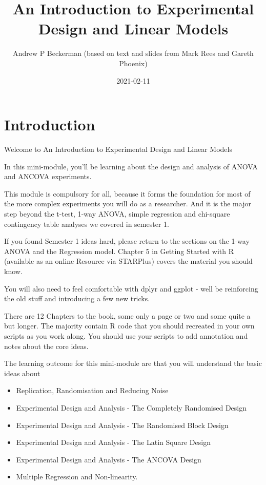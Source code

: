 \documentclass[
]{book}
\title{An Introduction to Experimental Design and Linear Models}
\author{Andrew P Beckerman (based on text and slides from Mark Rees and Gareth Phoenix)}
\date{2021-02-11}
\providecommand{\tightlist}{%
  \setlength{\itemsep}{0pt}\setlength{\parskip}{0pt}}
\begin{document}
\maketitle

{
\setcounter{tocdepth}{1}
\tableofcontents
}
\hypertarget{introduction}{%
\chapter{Introduction}\label{introduction}}

Welcome to An Introduction to Experimental Design and Linear Models

In this mini-module, you'll be learning about the design and analysis of ANOVA and ANCOVA experiments.

This module is compulsory for all, because it forms the foundation for most of the more complex experiments you will do as a researcher. And it is the major step beyond the t-test, 1-way ANOVA, simple regression and chi-square contingency table analyses we covered in semester 1.

If you found Semester 1 ideas hard, please return to the sections on the 1-way ANOVA and the Regression model. Chapter 5 in Getting Started with R (available as an online Resource via STARPlus) covers the material you should know.

You will also need to feel comfortable with dplyr and ggplot - well be reinforcing the old stuff and introducing a few new tricks.

There are 12 Chapters to the book, some only a page or two and some quite a but longer. The majority contain R code that you should recreated in your own scripts as you work along. You should use your scripts to add annotation and notes about the core ideas.

The learning outcome for this mini-module are that you will understand the basic ideas about

\begin{itemize}
\tightlist
\item
  Replication, Randomisation and Reducing Noise
\item
  Experimental Design and Analysis - The Completely Randomised Design
\item
  Experimental Design and Analysis - The Randomised Block Design
\item
  Experimental Design and Analysis - The Latin Square Design
\item
  Experimental Design and Analysis - The ANCOVA Design
\item
  Multiple Regression and Non-linearity.
\end{itemize}
\end{document}
